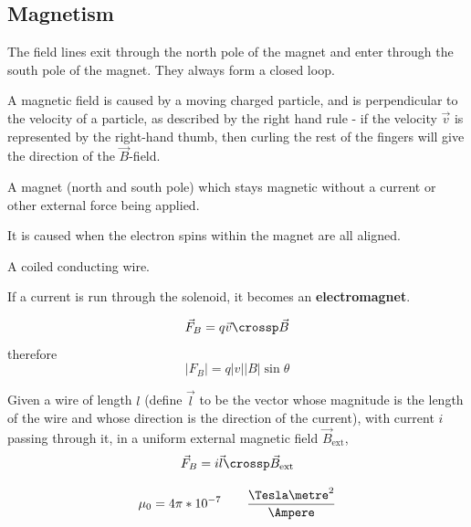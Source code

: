 \subsection{Magnetism}

\begin{definition}
  The field lines exit through the north pole of the magnet and enter through the south pole of the magnet. They always form a closed loop.

  A magnetic field is caused by a moving charged particle, and is perpendicular to the velocity of a particle, as described by the right hand rule - if the velocity $\vec{v}$ is represented by the right-hand thumb, then curling the rest of the fingers will give the direction of the $\vec{B}$-field.
\end{definition}

\begin{definition}
  A magnet (north and south pole) which stays magnetic without a current or other external force being applied.

  It is caused when the electron spins within the magnet are all aligned.
\end{definition}

\begin{definition}[Solenoid]
  A coiled conducting wire.

  If a current is run through the solenoid, it becomes an \textbf{electromagnet}.
\end{definition}

\begin{definition}
  \[
    \vec{F}_B = q \vec{v} \crossp \vec{B}
  \]
  therefore
  \[
    |F_B| = q |v| |B| \sin \theta
  \]
\end{definition}

\begin{lemma}
  Given a wire of length $l$ (define $\vec{l}$ to be the vector whose magnitude is the length of the wire and whose direction is the direction of the current), with current $i$ passing through it, in a uniform external magnetic field $\vec{B}_{\text{ext}}$,
  \[
    \vec{F}_B = i \vec{l} \crossp \vec{B}_{\text{ext}}
  \]
\end{lemma}

\begin{definition}
  \[
    \mu_0 = 4\pi * 10^{-7} \qquad \frac{\Tesla \metre^2}{\Ampere}
  \]
\end{definition}

